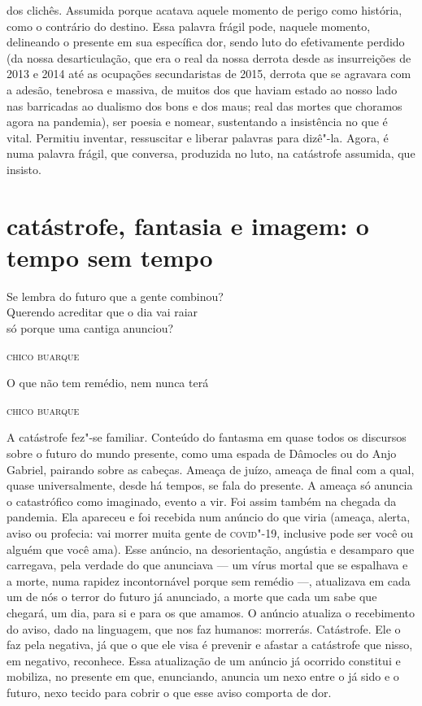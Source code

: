 dos clichês. Assumida porque acatava aquele momento de perigo como
história, como o contrário do destino. Essa palavra frágil pode, naquele
momento, delineando o presente em sua específica dor, sendo luto do
efetivamente perdido (da nossa desarticulação, que era o real da nossa
derrota desde as insurreições de 2013 e 2014 até as ocupações
secundaristas de 2015, derrota que se agravara com a adesão, tenebrosa e
massiva, de muitos dos que haviam estado ao nosso lado nas barricadas ao
dualismo dos bons e dos maus; real das mortes que choramos agora na
pandemia), ser poesia e nomear, sustentando a insistência no que é
vital. Permitiu inventar, ressuscitar e liberar palavras para dizê"-la.
Agora, é numa palavra frágil, que conversa, produzida no luto, na
catástrofe assumida, que insisto.

\pagebreak
\section{catástrofe, fantasia e imagem: o tempo sem tempo}

{\setlength{\epigraphwidth}{.5\textwidth}
\epigraph{Se lembra do futuro que a gente combinou?\\
Querendo acreditar que o dia vai raiar\\
só porque uma cantiga anunciou?}{\textsc{chico buarque}}}

\epigraph{O que não tem remédio, nem nunca terá}{\textsc{chico buarque}}

A catástrofe fez"-se familiar. Conteúdo do fantasma em quase todos os
discursos sobre o futuro do mundo presente, como uma espada de Dâmocles
ou do Anjo Gabriel, pairando sobre as cabeças. Ameaça de juízo, ameaça
de final com a qual, quase universalmente, desde há tempos, se fala do
presente. A ameaça só anuncia o catastrófico como imaginado, evento a
vir. Foi assim também na chegada da pandemia. Ela apareceu e foi
recebida num anúncio do que viria (ameaça, alerta, aviso ou profecia:
vai morrer muita gente de \textsc{covid}"-19, inclusive pode ser você ou alguém
que você ama). Esse anúncio, na desorientação, angústia e desamparo que
carregava, pela verdade do que anunciava --- um vírus mortal que se
espalhava e a morte, numa rapidez incontornável porque sem remédio ---,
atualizava em cada um de nós o terror do futuro já anunciado, a morte
que cada um sabe que chegará, um dia, para si e para os que amamos. O
anúncio atualiza o recebimento do aviso, dado na linguagem, que nos faz
humanos: morrerás. Catástrofe. Ele o faz pela negativa, já que o que ele
visa é prevenir e afastar a catástrofe que nisso, em negativo,
reconhece. Essa atualização de um anúncio já ocorrido constitui e
mobiliza, no presente em que, enunciando, anuncia um nexo entre o já
sido e o futuro, nexo tecido para cobrir o que esse aviso comporta de
dor.

